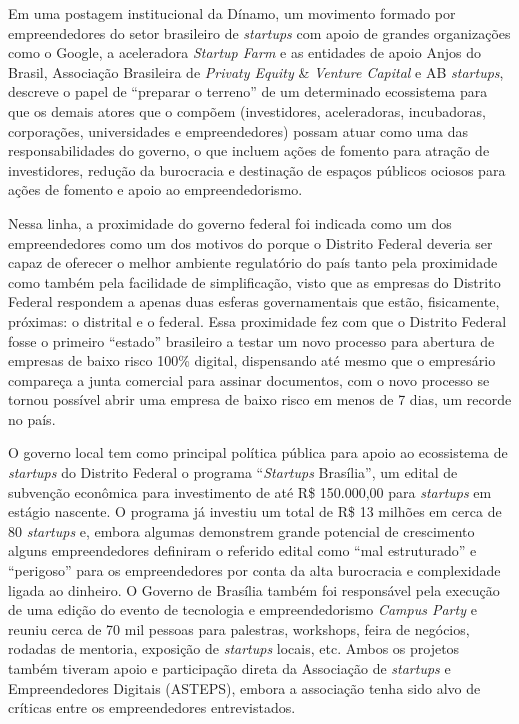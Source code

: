 Em uma postagem institucional da Dínamo, um movimento formado por empreendedores do setor brasileiro de \textit{startups} com apoio de grandes organizações como o Google, a aceleradora \textit{Startup Farm} e as entidades de apoio Anjos do Brasil, Associação Brasileira de \textit{Privaty Equity} \& \textit{Venture Capital} e AB \textit{startups},  descreve o papel de ``preparar o terreno'' de um determinado ecossistema para que os demais atores que o compõem (investidores, aceleradoras, incubadoras, corporações, universidades e empreendedores) possam atuar como uma das responsabilidades do governo, o que incluem ações de fomento para atração de investidores, redução da burocracia e destinação de espaços públicos ociosos para ações de fomento e apoio ao empreendedorismo.

Nessa linha, a proximidade do governo federal foi indicada como um dos empreendedores como um dos motivos do porque o Distrito Federal deveria ser capaz de oferecer o melhor ambiente regulatório do país tanto pela proximidade como também pela facilidade de simplificação, visto que as empresas do Distrito Federal respondem a apenas duas esferas governamentais que estão, fisicamente, próximas: o  distrital e o federal. Essa proximidade fez com que o Distrito Federal fosse o primeiro ``estado'' brasileiro a testar um novo processo para abertura de empresas de baixo risco 100\% digital, dispensando até mesmo que o empresário compareça a junta comercial para assinar documentos, com o novo processo se tornou possível abrir uma empresa de baixo risco em menos de 7 dias, um recorde no país.

O governo local tem como principal política pública para apoio ao ecossistema de \textit{startups} do Distrito Federal o programa ``\textit{Startups} Brasília'', um edital de subvenção econômica para investimento de até R\$ 150.000,00 para \textit{startups} em estágio nascente. O programa já investiu um total de R\$ 13 milhões em cerca de 80 \textit{startups} e, embora algumas demonstrem grande potencial de crescimento alguns empreendedores definiram o referido edital como ``mal estruturado'' e ``perigoso'' para os empreendedores por conta da alta burocracia e complexidade ligada ao dinheiro. O Governo de Brasília também foi responsável pela execução de uma edição do evento de tecnologia e empreendedorismo \textit{Campus Party} e reuniu cerca de 70 mil pessoas para palestras, workshops, feira de negócios, rodadas de mentoria, exposição de \textit{startups} locais, etc. Ambos os projetos também tiveram apoio e participação direta da Associação de \textit{startups} e Empreendedores Digitais (ASTEPS), embora a associação tenha sido alvo de críticas entre os empreendedores entrevistados.

